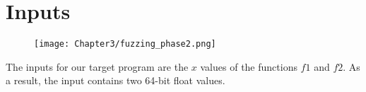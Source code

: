 \section{Inputs}

\begin{figure}[H]
    \centering
    \texttt{[image: Chapter3/fuzzing\_phase2.png]}
\end{figure}

The inputs for our target program are the $x$ values of the functions $f1$ and $f2$. As a result, the input contains two 64-bit float values. 



